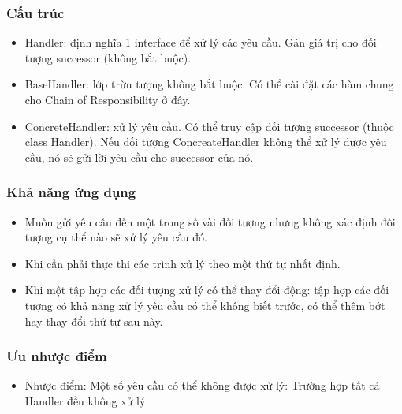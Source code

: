 \subsubsection{Cấu trúc}
\begin{flushleft}
\begin{itemize}
		\item Handler: định nghĩa 1 interface để xử lý các yêu cầu. Gán giá trị cho đối tượng successor (không bắt buộc).
		\item BaseHandler: lớp trừu tượng không bắt buộc. Có thể cài đặt các hàm chung cho Chain of Responsibility ở đây.
        \item ConcreteHandler: xử lý yêu cầu. Có thể truy cập đối tượng successor (thuộc class Handler). Nếu đối tượng ConcreateHandler không thể xử lý được yêu cầu, nó sẽ gửi lời yêu cầu cho successor của nó.
	\end{itemize}

\end{flushleft}

\subsubsection{Khả năng ứng dụng}
\begin{flushleft}
\begin{itemize}
		\item Muốn gửi yêu cầu đến một trong số vài đối tượng nhưng không xác định đối tượng cụ thể nào sẽ xử lý yêu cầu đó.
		\item Khi cần phải thực thi các trình xử lý theo một thứ tự nhất định.
        \item Khi một tập hợp các đối tượng xử lý có thể thay đổi động: tập hợp các đối tượng có khả năng xử lý yêu cầu có thể không biết trước, có thể thêm bớt hay thay đổi thứ tự sau này.
	\end{itemize}

\end{flushleft}

\subsubsection{Ưu nhược điểm}
\begin{flushleft}
\begin{itemize}
		\item Nhược điểm: Một số yêu cầu có thể không được xử lý: Trường hợp tất cả Handler đều không xử lý
	\end{itemize}

\end{flushleft}